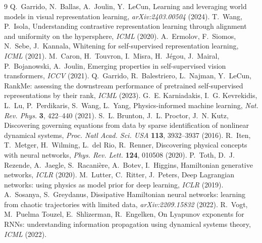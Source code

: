 \documentclass[journal]{IEEEtran}
\begin{document}
\begin{thebibliography}{9}
 Q.~Garrido, N.~Ballas, A.~Joulin, Y.~LeCun, Learning and leveraging world models in visual representation learning, \emph{arXiv:2403.00504} (2024).
 T.~Wang, P.~Isola, Understanding contrastive representation learning through alignment and uniformity on the hypersphere, \emph{ICML} (2020).
 A.~Ermolov, F.~Siomos, N.~Sebe, J.~Kannala, Whitening for self-supervised representation learning, \emph{ICML} (2021).
 M.~Caron, H.~Touvron, I.~Misra, H.~J\'egou, J.~Mairal, P.~Bojanowski, A.~Joulin, Emerging properties in self-supervised vision transformers, \emph{ICCV} (2021).
 Q.~Garrido, R.~Balestriero, L.~Najman, Y.~LeCun, RankMe: assessing the downstream performance of pretrained self-supervised representations by their rank, \emph{ICML} (2023).
 G.~E. Karniadakis, I.~G. Kevrekidis, L.~Lu, P.~Perdikaris, S.~Wang, L.~Yang, Physics-informed machine learning, \emph{Nat. Rev. Phys.} \textbf{3}, 422--440 (2021).
 S.~L. Brunton, J.~L. Proctor, J.~N. Kutz, Discovering governing equations from data by sparse identification of nonlinear dynamical systems, \emph{Proc. Natl Acad. Sci. USA} \textbf{113}, 3932--3937 (2016).
 R.~Iten, T.~Metger, H.~Wilming, L.~del Rio, R.~Renner, Discovering physical concepts with neural networks, \emph{Phys. Rev. Lett.} \textbf{124}, 010508 (2020).
 P.~Toth, D.~J. Rezende, A.~Jaegle, S.~Racani\`ere, A.~Botev, I.~Higgins, Hamiltonian generative networks, \emph{ICLR} (2020).
 M.~Lutter, C.~Ritter, J.~Peters, Deep Lagrangian networks: using physics as model prior for deep learning, \emph{ICLR} (2019).
 A.~Sosanya, S.~Greydanus, Dissipative Hamiltonian neural networks: learning from chaotic trajectories with limited data, \emph{arXiv:2209.15832} (2022).
 R.~Vogt, M.~Puelma Touzel, E.~Shlizerman, R.~Engelken, On Lyapunov exponents for RNNs: understanding information propagation using dynamical systems theory, \emph{ICML} (2022).
\end{thebibliography}
\end{document}
